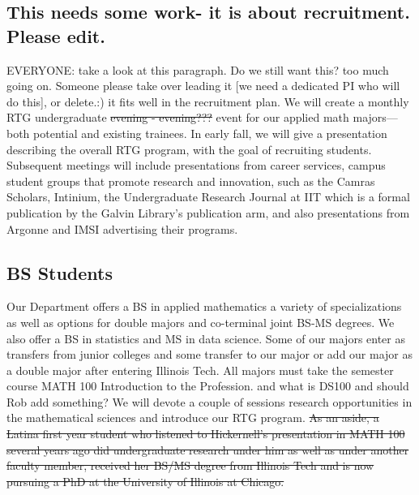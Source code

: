 \documentclass[11pt]{NSFamsart}
\begin{document}
\subsection*{This needs some work- it is about recruitment. Please edit.} 
{\color{red}EVERYONE: take a look at this paragraph. Do we still want this? too much going on. Someone please take over leading it [we need a dedicated PI who will do this], or delete.:) it fits well in the recruitment plan.}
We will create a monthly RTG undergraduate \sout{\color{red}evening - evening???}  event for our applied math majors---both potential and existing trainees.  In early fall, we will give a presentation describing the overall RTG program, with the goal of recruiting students. Subsequent meetings will include presentations from   career services, campus student groups that promote research and innovation, such as the Camras Scholars, Intinium, the Undergraduate Research Journal at IIT which is a formal publication by the Galvin Library's publication arm, %
and also presentations from Argonne and IMSI advertising their programs. 


\subsection*{BS Students}
Our Department  offers a BS in applied mathematics a variety of specializations as well as options for double majors and co-terminal joint BS-MS degrees. We also offer a BS in statistics and MS in data science.  Some of our majors enter as transfers from junior colleges and some transfer to our major or add our major as a double major after entering Illinois Tech.
All majors must take the semester course MATH 100 Introduction to the Profession. {\color{magenta}and what is DS100 and should Rob add something?}  We will devote a  couple of sessions research opportunities in the mathematical sciences and introduce our RTG program. \sout{As an aside, a Latina first year student who listened to Hickernell's presentation in MATH 100 several years ago did undergraduate research under him as well as under another faculty member, received her BS/MS degree from Illinois Tech and is now pursuing a PhD at the University of Illinois at Chicago.} 
\end{document}
